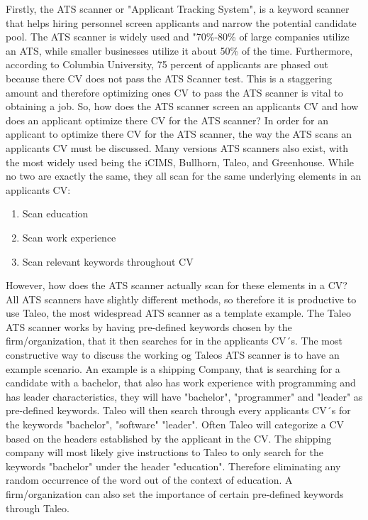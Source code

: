 Firstly, the ATS scanner or "Applicant Tracking System", is a keyword scanner that helps hiring personnel screen applicants and narrow the potential candidate pool.
The ATS scanner is widely used and "70\%-80\% of large companies utilize an ATS, while smaller businesses utilize it about 50\% of the time.\cite{ATS_Usage}
Furthermore, according to Columbia University, 75 percent of applicants are phased out because there CV does not pass the ATS Scanner test.
This is a staggering amount and therefore optimizing ones CV to pass the ATS scanner is vital to obtaining a job.
So, how does the ATS scanner screen an applicants CV and how does an applicant optimize there CV for the ATS scanner?
In order for an applicant to optimize there CV for the ATS scanner, the way the ATS scans an applicants CV must be discussed.
Many versions ATS scanners also exist, with the most widely used being the iCIMS, Bullhorn, Taleo, and Greenhouse.
While no two are exactly the same, they all scan for the same underlying elements in an applicants CV:
\begin{enumerate}
   \item Scan education
   \item Scan work experience
   \item Scan relevant keywords throughout CV
\end{enumerate}
However, how does the ATS scanner actually scan for these elements in a CV?
All ATS scanners have slightly different methods, so therefore it is productive to use Taleo, the most widespread ATS scanner as a template example.
The Taleo ATS scanner works by having pre-defined keywords chosen by the firm/organization, that it then searches for in the applicants CV´s.\cite{ATS_Taleo}
The most constructive way to discuss the working og Taleos ATS scanner is to have an example scenario.
An example is a shipping Company, that is searching for a candidate with a bachelor, that also has work experience with programming and has leader characteristics, they will have "bachelor", "programmer" and "leader" as pre-defined keywords.
Taleo will then search through every applicants CV´s for the keywords "bachelor", "software" "leader".\cite{ATS_Purpose_Workings}
Often Taleo will categorize a CV based on the headers established by the applicant in the CV.
The shipping company will most likely give instructions to Taleo to only search for the keywords "bachelor" under the header "education".
Therefore eliminating any random occurrence of the word out of the context of education.
A firm/organization can also set the importance of certain pre-defined keywords through Taleo.
